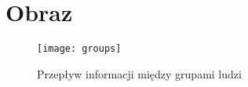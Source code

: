 \section{Obraz} 

		\begin{figure}[H]
			\centering
			\texttt{[image: groups]}
			\caption{Przepływ informacji między grupami ludzi}
			\label{groups}
		\end{figure} 	
